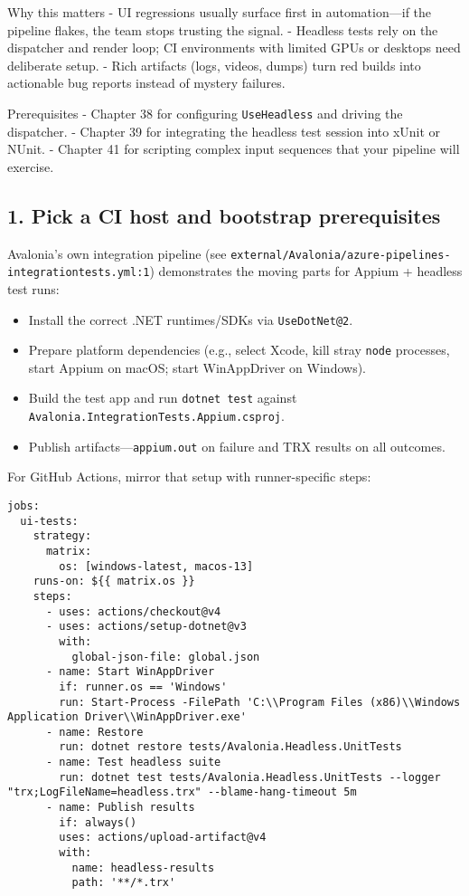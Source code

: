 Why this matters - UI regressions usually surface first in
automation---if the pipeline flakes, the team stops trusting the signal.
- Headless tests rely on the dispatcher and render loop; CI environments
with limited GPUs or desktops need deliberate setup. - Rich artifacts
(logs, videos, dumps) turn red builds into actionable bug reports
instead of mystery failures.

Prerequisites - Chapter 38 for configuring
\passthrough{\lstinline!UseHeadless!} and driving the dispatcher. -
Chapter 39 for integrating the headless test session into xUnit or
NUnit. - Chapter 41 for scripting complex input sequences that your
pipeline will exercise.

\subsection{1. Pick a CI host and bootstrap
prerequisites}\label{pick-a-ci-host-and-bootstrap-prerequisites}

Avalonia's own integration pipeline (see
\passthrough{\lstinline!external/Avalonia/azure-pipelines-integrationtests.yml:1!})
demonstrates the moving parts for Appium + headless test runs:

\begin{itemize}
\tightlist
\item
  Install the correct .NET runtimes/SDKs via
  \passthrough{\lstinline!UseDotNet@2!}.
\item
  Prepare platform dependencies (e.g., select Xcode, kill stray
  \passthrough{\lstinline!node!} processes, start Appium on macOS; start
  WinAppDriver on Windows).
\item
  Build the test app and run \passthrough{\lstinline!dotnet test!}
  against
  \passthrough{\lstinline!Avalonia.IntegrationTests.Appium.csproj!}.
\item
  Publish artifacts---\passthrough{\lstinline!appium.out!} on failure
  and TRX results on all outcomes.
\end{itemize}

For GitHub Actions, mirror that setup with runner-specific steps:

\begin{lstlisting}
jobs:
  ui-tests:
    strategy:
      matrix:
        os: [windows-latest, macos-13]
    runs-on: ${{ matrix.os }}
    steps:
      - uses: actions/checkout@v4
      - uses: actions/setup-dotnet@v3
        with:
          global-json-file: global.json
      - name: Start WinAppDriver
        if: runner.os == 'Windows'
        run: Start-Process -FilePath 'C:\\Program Files (x86)\\Windows Application Driver\\WinAppDriver.exe'
      - name: Restore
        run: dotnet restore tests/Avalonia.Headless.UnitTests
      - name: Test headless suite
        run: dotnet test tests/Avalonia.Headless.UnitTests --logger "trx;LogFileName=headless.trx" --blame-hang-timeout 5m
      - name: Publish results
        if: always()
        uses: actions/upload-artifact@v4
        with:
          name: headless-results
          path: '**/*.trx'
\end{lstlisting}


